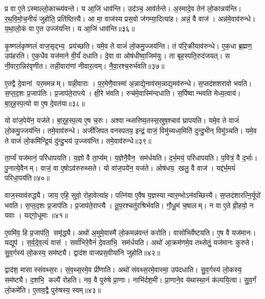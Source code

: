 प्र वा ए॒तेऽस्माल्लो॒काच्च्य॑वन्ते। य आ॒जिं धाव॑न्ति। उद॑ञ्च॒ आव॑र्तन्ते। अ॒स्मादे॒व तेन॑ लो॒कान्नय॑न्ति। र॒थ॒वि॒मो॒च॒नीयं॑ जुहोति॒ प्रति॑ष्ठित्त्यै। आ मा॒ वाज॑स्य प्रस॒वो ज॑गम्या॒दित्या॑ह। अन्नं॒ वै वाज॑। अन्न॑मे॒वाव॑रुन्धे। य॒था॒लो॒कं वा ए॒त उज्ज॑यन्ति। य आ॒जिं धाव॑न्ति॥३६॥

कृ॒ष्णलं॑कृष्णलं वाज॒सृद्भ्य॒ प्रय॑च्छति। यमे॒व ते वाजं॑ लो॒कमु॒ज्जय॑न्ति। तं प॑रि॒क्रीयाव॑रुन्धे। ए॒क॒धा ब्र॒ह्मण॒ उप॑हरति। ए॒क॒धैव यज॑माने वी॒र्यं॑ दधाति। दे॒वा वा ओष॑धीष्वा॒जिम॑युः। ता बृह॒स्पति॒रुद॑जयत्। स नी॒वारा॒न्निर॑वृणीत। तन्नी॒वारा॑णां नीवार॒त्वम्। नै॒वा॒रश्च॒रुर्भ॑वति॥३७॥

ए॒तद्वै दे॒वानां पर॒ममन्नम्। यन्नी॒वाराः। प॒र॒मेणै॒वास्मा॑ अ॒न्नाद्ये॒नाव॑रम॒न्नाद्य॒मव॑रुन्धे। स॒प्तद॑शशरावो भवति। स॒प्त॒द॒शः प्र॒जाप॑तिः। प्र॒जाप॑ते॒राप्त्ये। क्षी॒रे भ॑वति। रुच॑मे॒वास्मि॑न्दधाति। स॒र्पिष्वान्भवति मेध्य॒त्वाय॑। बा॒र्॒ह॒स्प॒त्यो वा ए॒ष दे॒वत॑या॥३८॥

यो वा॑ज॒पेये॑न॒ यज॑ते। बा॒र्॒ह॒स्प॒त्य ए॒ष च॒रुः। अश्वान्थ्सरिष्य॒तस्स॒स्रुष॒श्चाव॑ घ्रापयति। यमे॒व ते वाजं॑ लो॒कमु॒ज्जय॑न्ति। तमे॒वाव॑रुन्धे। अजी॑जिपत वनस्पतय॒ इन्द्रं॒ वाजं॒ विमु॑च्यध्व॒मिति॑ दुन्दु॒भीन् विमु॑ञ्चति। यमे॒व ते वाजं॑ लो॒कमि॑न्द्रि॒यं दु॑न्दु॒भय॑ उ॒ज्जय॑न्ति। तमे॒वाव॑रुन्धे॥३९॥

ता॒र्प्यं यज॑मानं॒ परि॑धापयति। य॒ज्ञो वै ता॒र्प्यम्। य॒ज्ञेनै॒वैन॒ सम॑र्धयति। द॒र्भ॒मयं॒ परि॑धापयति। प॒वित्रं॒ वै द॒र्भाः। पु॒नात्ये॒वैनम्। वाजं॒ वा ए॒षोऽव॑रुरुथ्सते। यो वा॑ज॒पये॑न॒ यज॑ते। ओष॑धय॒ खलु॒ वै वाज॑। यद्द॑र्भ॒मयं॑ परिधा॒पय॑ति॥४०॥

वाज॒स्याव॑रुद्ध्यै। जाय॒ एहि॒ सुवो॒ रोहा॒वेत्या॑ह। पत्नि॑या ए॒वैष य॒ज्ञस्यान्वार॒म्भोऽन॑वच्छित्त्यै। स॒प्तद॑शारत्नि॒र्यूपो॑ भवति। स॒प्त॒द॒शः प्र॒जाप॑तिः। प्र॒जाप॑ते॒राप्त्यै। तू॒प॒रश्चतु॑रश्रिर्भवति। गौ॒धू॒मं च॒षालम्। न वा ए॒ते व्री॒हयो॒ न यवाः। यद्गो॒धूमाः॥४१॥

ए॒वमि॑व॒ हि प्र॒जाप॑ति॒ समृ॑द्ध्यै। अथो॑ अ॒मुमे॒वास्मै॑ लो॒कमन्न॑वन्तं करोति। वासो॑भिर्वेष्टयति। ए॒ष वै यज॑मानः। यद्यूप॑। स॒र्व॒दे॒व॒त्यं॑ वास॑। सर्वा॑भिरे॒वैनं॑ दे॒वता॑भि॒ सम॑र्धयति। अथो॑ आ॒क्रम॑णमे॒व तथ्सेतुं॒ यज॑मानः कुरुते। सु॒व॒र्गस्य॑ लो॒कस्य॒ सम॑ष्ट्यै। द्वाद॑श वाजप्रस॒वीया॑नि जुहोति॥४२॥

द्वाद॑श॒ मासास्संवथ्स॒रः। सं॒व॒थ्स॒रमे॒व प्री॑णाति। अथो॑ संवथ्स॒रमे॒वास्मा॒ उप॑दधाति। सु॒व॒र्गस्य॑ लो॒कस्य॒ सम॑ष्ट्यै। द॒शभि॒ कल्पै॑ रोहति। नव॒ वै पुरु॑षे प्रा॒णाः। नाभि॑र्दश॒मी। प्रा॒णाने॒व य॑थास्था॒नं क॑ल्पयि॒त्वा। सु॒व॒र्गं लो॒कमे॑ति। ए॒ताव॒द्वै पुरु॑षस्य॒ स्वम्॥४३॥


